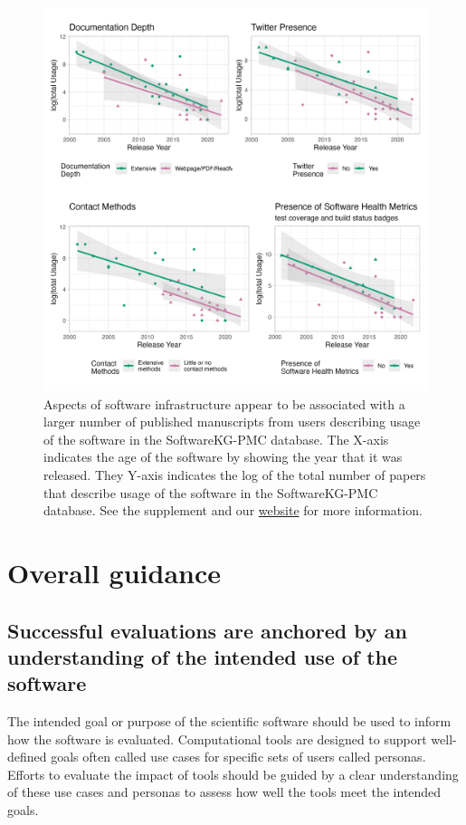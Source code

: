 \documentclass{article}
\begin{document}
\begin{figure}[ht]
    \centering
\includegraphics[width=\textwidth,height=\textheight,keepaspectratio]{images/logUsage_stratified_2x2.png}
    \caption{Aspects of software infrastructure appear to be associated with a larger number of published manuscripts from users describing usage of the software in the SoftwareKG-PMC database. The X-axis indicates the age of the software by showing the year that it was released. They Y-axis indicates the log of the total number of papers that describe usage of the software in the SoftwareKG-PMC database. See the supplement and our \href{https://hutchdatascience.org/ITCR_Metrics_manuscript_website/}{website} for more information.}
    \label{fig:inf_cit}
\end{figure}



\section{Overall guidance}





\subsection{Successful evaluations are anchored by an understanding of the intended use of the software}
\label{sec:use_understanding}
The intended goal or purpose of the scientific software should be used to inform how the software is evaluated. Computational tools are designed to support well-defined goals often called use cases \cite{gamma_design_1995} for specific sets of users called personas\cite{cooper_inmates_2004}. Efforts to evaluate the impact of tools should be guided by a clear understanding of these use cases and personas to assess how well the tools meet the intended goals.  
\end{document}
